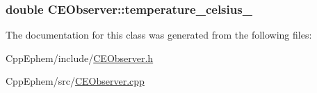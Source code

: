 \subsubsection[{temperature\+\_\+celsius\+\_\+}]{\setlength{\rightskip}{0pt plus 5cm}double C\+E\+Observer\+::temperature\+\_\+celsius\+\_\+\hspace{0.3cm}{\ttfamily [protected]}}\label{class_c_e_observer_ac29e9479df58bd3bed6d4b749747b2bd}


The documentation for this class was generated from the following files\+:\begin{DoxyCompactItemize}
\item 
Cpp\+Ephem/include/\hyperlink{_c_e_observer_8h}{C\+E\+Observer.\+h}\item 
Cpp\+Ephem/src/\hyperlink{_c_e_observer_8cpp}{C\+E\+Observer.\+cpp}\end{DoxyCompactItemize}
